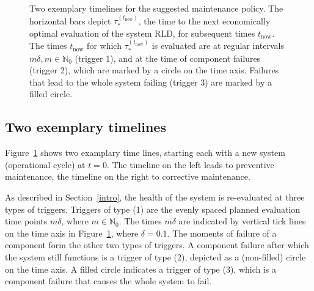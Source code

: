 \documentclass[authoryear]{elsarticle}
\newcommand{\naturals}{\mathbb{N}}
\def\tnow{t_\text{now}}
\newcommand{\tausnow}{\tau_*^{(\tnow)}}
\newcommand{\tthresh}{\tau_{\text{thresh}}}
\begin{document}
\begin{figure}
\caption{Two exemplary timelines for the suggested maintenance policy.
The horizontal bars depict $\tausnow$,
the time to the next economically optimal evaluation of the system RLD,
for subsequent times $\tnow$.
The times $\tnow$ for which $\tausnow$ is evaluated are
at regular intervals $m \delta, m \in \naturals_0$ (trigger 1),
and at the time of component failures (trigger 2),
which are marked by a circle on the time axis.
Failures that lead to the whole system failing (trigger 3) are marked by a filled circle.}
\label{fig:timeline}
\end{figure}


\subsection{Two exemplary timelines}
\label{sec:policy-example}

Figure~\ref{fig:timeline} shows two examplary time lines,
starting each with a new system (operational cycle) at $t=0$.
The timeline on the left leads to preventive maintenance,
the timeline on the right to corrective maintenance.

As described in Section~\ref{intro},
the health of the system is re-evaluated at three types of triggers.
Triggers of type (1) are the evenly spaced planned evaluation time points $m\delta$, where $m \in \naturals_0$.
The times $m\delta$ are indicated by vertical tick lines on the time axis in Figure~\ref{fig:timeline},
where $\delta = 0.1$.
The moments of failure of a component form the other two types of triggers.
A component failure after which the system still functions is a trigger of type (2),
depicted as a (non-filled) circle on the time axis.
A filled circle indicates a trigger of type (3),
which is a component failure that causes the whole system to fail.
\end{document}
